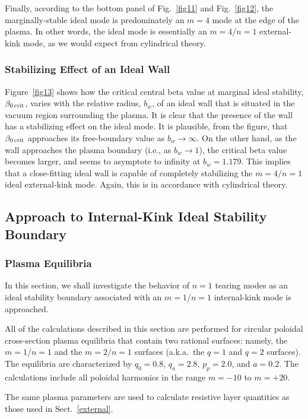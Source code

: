 \documentclass[12pt,prb,aps]{revtex4-1}
\begin{document}
Finally, according to the bottom panel of Fig.~\ref{fig11} and Fig.~\ref{fig12}, the marginally-stable ideal mode  is predominately an
$m=4$ mode at the edge of the plasma. In other words, the ideal mode is essentially an $m=4/n=1$ external-kink mode, as we would expect from
cylindrical theory.\cite{freidberg,wesson} 

\subsubsection{Stabilizing Effect of an Ideal Wall}\label{stabw1}
Figure~\ref{fig13} shows how the critical central beta value at marginal ideal stability, $\beta_{0\,{\rm crit}}$, varies with the
relative radius, $b_w$, of an ideal wall that is situated in the vacuum region surrounding the plasma. It is clear that the
presence of the wall has a stabilizing effect on the ideal mode.  It is plausible, from
the figure, that $\beta_{0\,{\rm crit}}$ approaches its free-boundary value as $b_w\rightarrow \infty$. On the other hand,
as the wall approaches the plasma boundary (i.e., as $b_w\rightarrow 1$), the critical beta value becomes larger, and seems
to asymptote to infinity at $b_w=1.179$. This implies that a close-fitting ideal wall is capable of completely stabilizing the
$m=4/n=1$ ideal external-kink mode. Again, this is in accordance with cylindrical theory.\cite{freidberg,wesson}

\subsection{Approach to Internal-Kink Ideal Stability Boundary}
\subsubsection{Plasma Equilibria}
In this section, we shall investigate the behavior of $n=1$ tearing modes as an ideal stability boundary associated with an  $m=1/n=1$ internal-kink mode is approached. 

All of the calculations described in this section are performed for circular poloidal cross-section plasma equilibria that contain two rational surfaces: namely, the $m=1/n=1$ and the $m=2/n=1$ surfaces (a.k.a.\ the $q=1$ and $q=2$ surfaces). 
The equilibria are  characterized by $q_0=0.8$, $q_a=2.8$, $p_p=2.0$, and $a=0.2$. The calculations include all poloidal harmonics in the range $m=-10$ to $m=+20$. 

The same  plasma parameters  are used to calculate resistive layer quantities as those used in Sect.~\ref{external}. 
\end{document}
